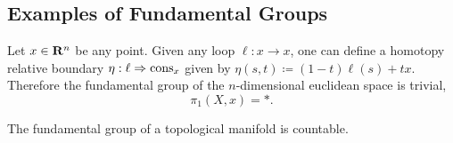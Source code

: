 
\subsection{Examples of Fundamental Groups}

\begin{example}
\label{exp:euclidean-space-pi1-is-trivial}
Let \(x \in \mathbf{R}^n\) be any point. Given any loop \(\ell: x \to x\), one can
define a homotopy relative boundary \(\eta: \ell \Rightarrow \operatorname{cons}_x\) given by
\(\eta(s, t) \coloneq (1 - t) \ell(s) + t x\). Therefore the fundamental group
of the \(n\)-dimensional euclidean space is trivial,
\[
\pi_1(X, x) = *.
\]
\end{example}

\begin{proposition}
\label{prop:pi1-manifold-is-countable}
The fundamental group of a topological manifold is countable.
\end{proposition}

